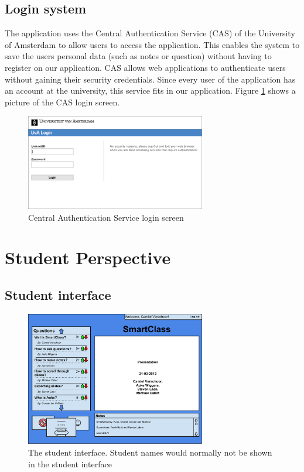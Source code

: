 \documentclass[11pt]{article}
\begin{document}
\subsection{Login system}
The application uses the Central Authentication Service (CAS) of the University of Amsterdam to allow users to access the application. This enables the system to save the users personal data (such as notes or question) without having to register on our application. CAS allows web applications to authenticate users without gaining their security credentials. Since every user of the application has an account at the university, this service fits in our application. Figure \ref{CAS} shows a picture of the CAS login screen.
\begin{figure}[!h]
\centering
\includegraphics[width=0.7\textwidth]{Cas.png}
\caption{Central Authentication Service login screen}
\label{CAS}
\end{figure}

\section{Student Perspective}
\subsection{Student interface}

\begin{figure}[!h]
\centering
\includegraphics[width=0.7\textwidth]{studentInterface.pdf}
\caption{The student interface. Student names would normally not be shown in the student interface}
\label{studentInterface}
\end{figure}
\end{document}
